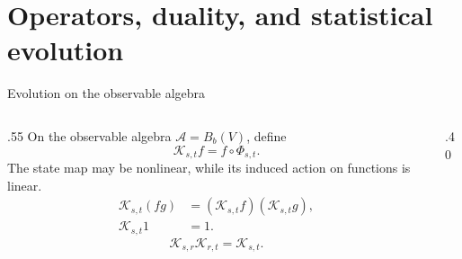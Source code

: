 \section[Observable evolution]{Operators, duality, and statistical evolution}

\begin{frame}[t]{Evolution on the observable algebra}
\hypertarget{main:observables}{}
\begin{columns}[T,onlytextwidth]
  \begin{column}{.55\textwidth}
    On the observable algebra $\mathcal A=B_b(V)$, define
    \begin{equation*}
      \mathcal{K}_{s,t}f=f\circ\Phi_{s,t}.
    \end{equation*}
    The state map may be nonlinear, while its induced action on functions is linear.
    \begin{equation*}
      \begin{aligned}
        \mathcal{K}_{s,t}(fg)&=(\mathcal{K}_{s,t}f)(\mathcal{K}_{s,t}g),\\
        \mathcal{K}_{s,t}1&=1.
      \end{aligned}
    \end{equation*}
    \begin{equation*}
      \mathcal{K}_{s,r}\mathcal{K}_{r,t}=\mathcal{K}_{s,t}.
    \end{equation*}
  \end{column}
  \begin{column}{.40\textwidth}
    \vspace{7pt}
  \end{column}
\end{columns}
\end{frame}

